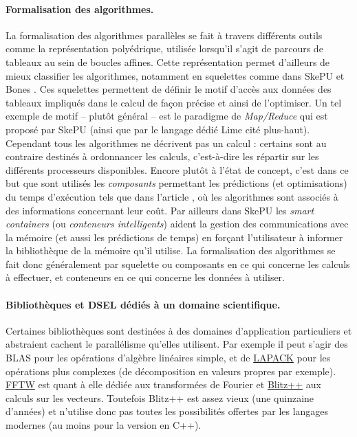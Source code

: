 \paragraph{Formalisation des algorithmes.}
La formalisation des algorithmes parallèles se fait à travers différents outils comme la représentation polyédrique, utilisée lorsqu'il s'agit de parcours de tableaux au sein de boucles affines. Cette représentation permet d'ailleurs de mieux classifier les algorithmes, notamment en squelettes comme dans \textsf{SkePU} et \textsf{Bones} \cite{Art4,Art3,Art9}. Ces squelettes permettent de définir le motif d'accès aux données des tableaux impliqués dans le calcul de façon précise et ainsi de l'optimiser. Un tel exemple de motif -- plutôt général -- est le paradigme de \emph{Map/Reduce} qui est proposé par \textsf{SkePU} \cite{MstThs1} (ainsi que par le langage dédié \textsf{Lime} cité plus-haut). Cependant tous les algorithmes ne décrivent pas un calcul : certains sont au contraire destinés à ordonnancer les calculs, c'est-à-dire les répartir sur les différents processeurs disponibles. Encore plutôt à l'état de concept, c'est dans ce but que sont utilisés les \emph{composants} permettant les prédictions (et optimisations) du temps d'exécution tels que dans l'article \cite{Art7}, où les algorithmes sont associés à des informations concernant leur coût. Par ailleurs dans \textsf{SkePU} \cite[p.~78]{Ths1} les \emph{smart containers} (ou \emph{conteneurs intelligents}) aident la gestion des communications avec la mémoire (et aussi les prédictions de temps) en forçant l'utilisateur à informer la bibliothèque de la mémoire qu'il utilise. La formalisation des algorithmes se fait donc généralement par squelette ou composants en ce qui concerne les calculs à effectuer, et conteneurs en ce qui concerne les données à utiliser.

\paragraph{Bibliothèques et DSEL dédiés à un domaine scientifique.}
Certaines bibliothèques sont destinées à des domaines d'application particuliers et abstraient cachent le parallélisme qu'elles utilisent. Par exemple il peut s'agir des \textsf{BLAS} pour les opérations d'algèbre linéaires simple, et de \textsf{\href{http://www.netlib.org/lapack/}{LAPACK}} pour les opérations plus complexes (de décomposition en valeurs propres par exemple). \textsf{\href{http://www.fftw.org/}{FFTW}} est quant à elle dédiée aux transformées de Fourier et \textsf{\href{http://sourceforge.net/projects/blitz/}{Blitz++}} aux calculs sur les vecteurs. Toutefois \textsf{Blitz++} est assez vieux (une quinzaine d'années) et n'utilise donc pas toutes les possibilités offertes par les langages modernes (au moins pour la version en \textsf{C++}).


